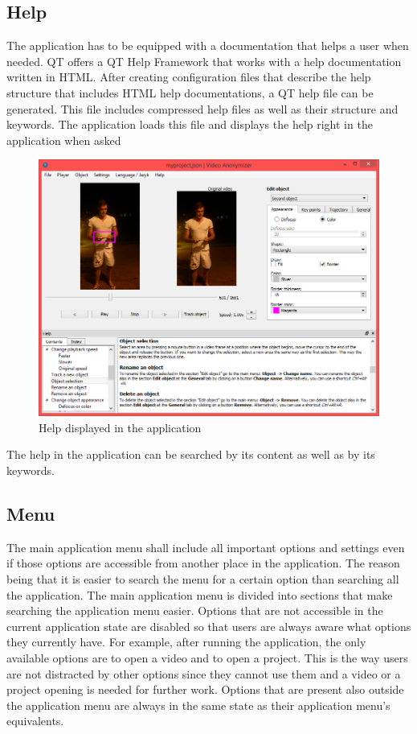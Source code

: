 \subsection{Help}\label{subs:help}
The application has to be equipped with a documentation that helps a user when needed. QT offers a QT Help Framework that works with a help documentation written in HTML. After creating configuration files that describe the help structure that includes HTML help documentations, a QT help file can be generated. This file includes compressed help files as well as their structure and keywords. The application loads this file and displays the help right in the application when asked~\cite{walletfox_help}
\begin{figure}[!htbp]
\centering
\includegraphics[width=\textwidth]{png/help}
\caption{Help displayed in the application}
\label{fig:help}
\end{figure}
The help in the application can be searched by its content as well as by its keywords.

\subsection{Menu}
The main application menu shall include all important options and settings even if those options are accessible from another place in the application. The reason being that it is easier to search the menu for a certain option than searching all the application. The main application menu is divided into sections that make searching the application menu easier. Options that are not accessible in the current application state are disabled so that users are always aware what options they currently have. For example, after running the application, the only available options are to open a video and to open a project. This is the way users are not distracted by other options since they cannot use them and a video or a project opening is needed for further work. Options that are present also outside the application menu are always in the same state as their application menu's equivalents.


